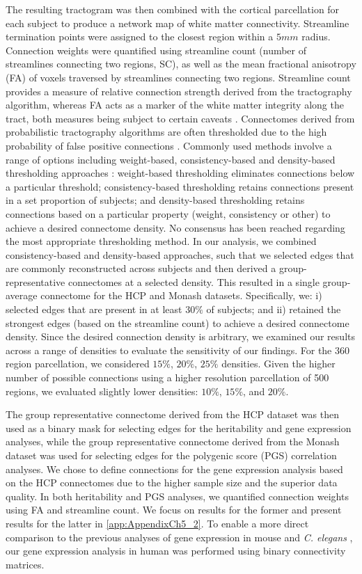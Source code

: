 The resulting tractogram was then combined with the cortical parcellation for each subject to produce a network map of white matter connectivity. Streamline termination points were assigned to the closest region within a $5mm$ radius. Connection weights were quantified using streamline count (number of streamlines connecting two regions, SC), as well as the mean fractional anisotropy (FA) of voxels traversed by streamlines connecting two regions. Streamline count provides a measure of relative connection strength derived from the tractography algorithm, whereas FA acts as a marker of the white matter integrity along the tract, both measures being subject to certain caveats \citep{Jones2013}. 
Connectomes derived from probabilistic tractography algorithms are often thresholded due to the high probability of false positive connections \citep{Sarwar2019,Sotiropoulos2017}. Commonly used methods involve a range of options including weight-based, consistency-based and density-based thresholding approaches \citep{Betzel2018,Roberts2016a}: weight-based thresholding eliminates connections below a particular threshold; consistency-based thresholding retains connections present in a set proportion of subjects; and density-based thresholding retains connections based on a particular property (weight, consistency or other) to achieve a desired connectome density. No consensus has been reached regarding the most appropriate thresholding method. In our analysis, we combined consistency-based and density-based approaches, such that we selected edges that are commonly reconstructed across subjects and then derived a group-representative connectomes at a selected density. This resulted in a single group-average connectome for the HCP and Monash datasets. Specifically, we: i) selected edges that are present in at least $30\%$ of subjects; and ii) retained the strongest edges (based on the streamline count) to achieve a desired connectome density. Since the desired connection density is arbitrary, we examined our results across a range of densities to evaluate the sensitivity of our findings. For the 360 region parcellation, we considered $15\%$, $20\%$, $25\%$ densities. Given the higher number of possible connections using a higher resolution parcellation of 500 regions, we evaluated slightly lower densities: $10\%$, $15\%$, and $20\%$. 

The group representative connectome derived from the HCP dataset was then used as a binary mask for selecting edges for the heritability and gene expression analyses, while the group representative connectome derived from the Monash dataset was used for selecting edges for the polygenic score (PGS) correlation analyses. We chose to define connections for the gene expression analysis based on the HCP connectomes due to the higher sample size and the superior data quality. In both heritability and PGS analyses, we quantified connection weights using FA and streamline count. We focus on results for the former and present results for the latter in \ref{app:AppendixCh5_2}. To enable a more direct comparison to the previous analyses of gene expression in mouse \citep{Fulcher2016} and \textit{C. elegans} \citep{Arnatkeviciute2018}, our gene expression analysis in human was performed using binary connectivity matrices. 


